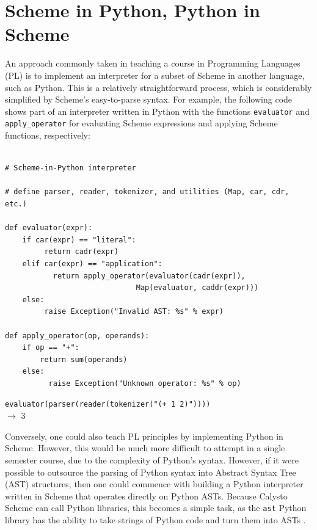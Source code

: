 \documentclass[acmsmall,screen,authorversion]{acmart}
\begin{document}
\section{Scheme in Python, Python in Scheme}

An approach commonly taken in teaching a course in Programming Languages (PL)
is to implement an interpreter for a subset of Scheme in another language, such
as Python. This is a relatively straightforward process, which is considerably
simplified by Scheme's easy-to-parse syntax.  For example, the following code
shows part of an interpreter written in Python with the functions
\texttt{evaluator} and \texttt{apply\_operator} for evaluating Scheme
expressions and applying Scheme functions, respectively:

\begin{minipage}{0.5\textwidth}
{\footnotesize
\begin{verbatim}

# Scheme-in-Python interpreter

# define parser, reader, tokenizer, and utilities (Map, car, cdr, etc.)

def evaluator(expr):
    if car(expr) == "literal":
         return cadr(expr)
    elif car(expr) == "application":
           return apply_operator(evaluator(cadr(expr)),
                              Map(evaluator, caddr(expr)))
    else:
         raise Exception("Invalid AST: %s" % expr)

def apply_operator(op, operands):
    if op == "+":
        return sum(operands)
    else:
          raise Exception("Unknown operator: %s" % op)

\end{verbatim}
\texttt{evaluator(parser(reader(tokenizer("(+ 1 2)"))))}\\
$\rightarrow$ 3\\
}
\end{minipage}

\noindent
Conversely, one could also teach PL principles by implementing Python in
Scheme. However, this would be much more difficult to attempt in a single
semester course, due to the complexity of Python's syntax. However, if it were
possible to outsource the parsing of Python syntax into Abstract Syntax Tree
(AST) structures, then one could commence with building a Python interpreter
written in Scheme that operates directly on Python ASTs. Because Calysto Scheme
can call Python libraries, this becomes a simple task, as the \texttt{ast}
Python library has the ability to take strings of Python code and turn them
into ASTs \cite{PythonInScheme}.
\end{document}

